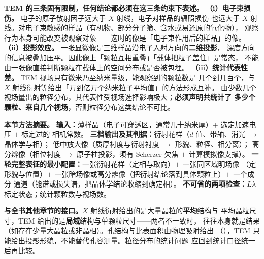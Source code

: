 \begin{pitfall}
\textbf{TEM 的三条固有限制，任何结论都必须在这三条约束下表述。}
\textbf{（i）电子束损伤。} 电子的原子散射因子远大于 $X$ 射线，电子对样品的辐照损伤
也远大于 $X$ 射线。对电子束敏感的样品（有机物、部分分子筛、含水或易还原的氧化物），
观察行为本身可能改变被观察对象——这时的像是「电子束作用后的样品」的像。
\textbf{（ii）投影效应。} 一张显微像是三维样品沿电子入射方向的\textbf{二维投影}，
深度方向的信息被叠加压平。因此像上「颗粒互相重叠」「载体把粒子盖住」是常态，
不能由一张像直接判断颗粒在载体上的空间分布或是否被包埋。
\textbf{（iii）统计代表性差。} TEM 视场只有微米乃至纳米量级，能观察到的颗粒数是
几个到几百个，与 $X$ 射线衍射等给出「万到亿万个纳米粒子平均值」的方法形成互补。
由少数几个视场量出的粒径分布，其代表性受视场选择影响极大；\textbf{必须声明共统计了
多少个颗粒、来自几个视场}，否则粒径分布这类结论不可比。
\end{pitfall}

\begin{methodsum}
\textbf{本节方法摘要。}
\textbf{输入：}薄样品（电子可穿透区，通常几十纳米厚）$+$ 选定加速电压 $+$ 标定过的
相机常数。
\textbf{三档输出及其判据：}衍射花样（$d$ 值、带轴、消光 $\to$ 晶体学与相）；
低中放大像（质厚衬度与衍射衬度 $\to$ 形貌、粒径、相分离）；
高分辨像（相位衬度 $\to$ 原子柱投影，须有 Scherzer 欠焦 $+$ 计算模拟像支撑）。
\textbf{一轮完整表征的最小配置：}一张衍射花样（定相与取向）$+$ 一张同区域明场像
（定形貌与位置）$+$ 一张暗场像或高分辨像（把衍射结论落到具体颗粒上）$+$ 一个成分
通道（能谱或损失谱，把晶体学结论收缩到确定相）。
\textbf{不可省的两项检查：}$L\lambda$ 标定状态；统计颗粒数与视场数。
\end{methodsum}

\begin{crosscheck}
\textbf{与全书其他章节的接口。}$X$ 射线衍射给出的是大量晶粒的\textbf{平均}结构与
平均晶粒尺寸，TEM 给出的是\textbf{局域}结构与单颗粒尺寸——两者不一致时，
往往本身就是结果（如存在少量大晶粒或非晶相）。孔结构与比表面积由物理吸附给出
（），TEM 只能给出投影形貌，不能替代孔容测量。粒径分布的统计问题
应回到统计口径统一后再比较。
\end{crosscheck}

